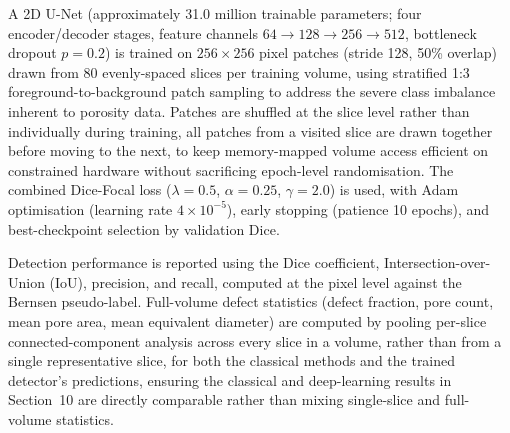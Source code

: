 A 2D U-Net (approximately 31.0 million trainable parameters; four encoder/decoder stages, feature
channels $64\to128\to256\to512$, bottleneck dropout $p = 0.2$) is trained on $256\times256$ pixel
patches (stride 128, 50\% overlap) drawn from 80 evenly-spaced slices per training volume, using
stratified 1:3 foreground-to-background patch sampling to address the severe class imbalance
inherent to porosity data. Patches are shuffled at the slice level rather than individually during
training, all patches from a visited slice are drawn together before moving to the next, to keep
memory-mapped volume access efficient on constrained hardware without sacrificing epoch-level
randomisation. The combined Dice-Focal loss ($\lambda = 0.5$, $\alpha = 0.25$, $\gamma = 2.0$) is
used, with Adam optimisation (learning rate $4\times10^{-5}$), early stopping (patience 10 epochs),
and best-checkpoint selection by validation Dice.

Detection performance is reported using the Dice coefficient, Intersection-over-Union (IoU),
precision, and recall, computed at the pixel level against the Bernsen pseudo-label. Full-volume
defect statistics (defect fraction, pore count, mean pore area, mean equivalent diameter) are
computed by pooling per-slice connected-component analysis across every slice in a volume, rather
than from a single representative slice, for both the classical methods and the trained detector's
predictions, ensuring the classical and deep-learning results in Section~10 are directly comparable
rather than mixing single-slice and full-volume statistics.
